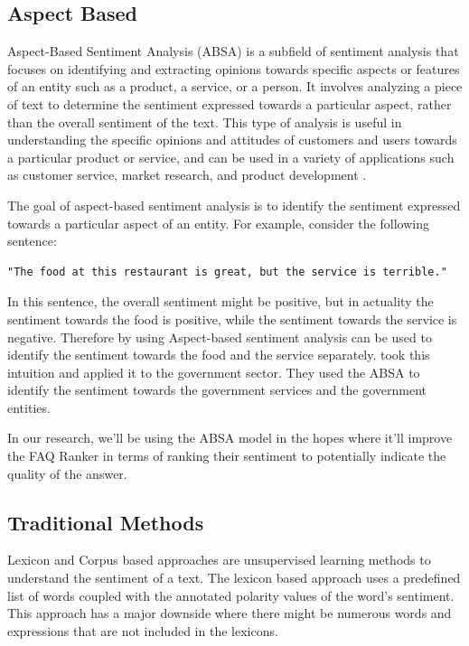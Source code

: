 \subsection{Aspect Based}
Aspect-Based Sentiment Analysis (ABSA) is a subfield of sentiment analysis that focuses on identifying and extracting opinions towards specific aspects or features of an entity such as a product, a service, or a person. It involves analyzing a piece of text to determine the sentiment expressed towards a particular aspect, rather than the overall sentiment of the text. This type of analysis is useful in understanding the specific opinions and attitudes of customers and users towards a particular product or service, and can be used in a variety of applications such as customer service, market research, and product development \cite{ABSAUSGRD2019} \cite{9260162} \cite{xue-li-2018-aspect} \cite{MABDELGWAD20226652}.

The goal of aspect-based sentiment analysis is to identify the sentiment expressed towards a particular aspect of an entity. For example, consider the following sentence: 

\noindent \begin{lstlisting}
"The food at this restaurant is great, but the service is terrible."
\end{lstlisting}

\noindent In this sentence, the overall sentiment might be positive, but in actuality the sentiment towards the food is positive, while the sentiment towards the service is negative. Therefore by using Aspect-based sentiment analysis can be used to identify the sentiment towards the food and the service separately. \cite{ABSAUSGRD2019} took this intuition and applied it to the government sector. They used the ABSA to identify the sentiment towards the government services and the government entities.

\noindent In our research, we'll be using the ABSA model in the hopes where it'll improve the FAQ Ranker in terms of ranking their sentiment to potentially indicate the quality of the answer.

\subsection{Traditional Methods}
Lexicon and Corpus based approaches are unsupervised learning methods to understand the sentiment of a text. The lexicon based approach uses a predefined list of words coupled with the annotated polarity values of the word's sentiment. This approach has a major downside where there might be numerous words and expressions that are not included in the lexicons. 

